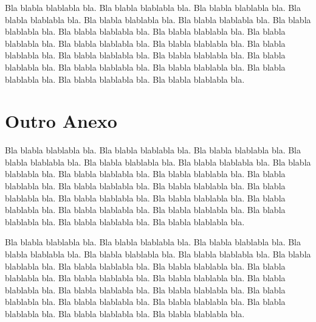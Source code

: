 \documentclass[tese,capa]{texufpel}
\begin{document}
Bla blabla blablabla bla.  Bla blabla blablabla bla.  Bla blabla
blablabla bla.  Bla blabla blablabla bla.  Bla blabla blablabla bla.
Bla blabla blablabla bla.  Bla blabla blablabla bla.  Bla blabla
blablabla bla.  Bla blabla blablabla bla.  Bla blabla blablabla bla.
Bla blabla blablabla bla.  Bla blabla blablabla bla.  Bla blabla
blablabla bla.  Bla blabla blablabla bla.  Bla blabla blablabla bla.
Bla blabla blablabla bla.  Bla blabla blablabla bla.  Bla blabla
blablabla bla.  Bla blabla blablabla bla.  Bla blabla blablabla bla.
Bla blabla blablabla bla.

\chapter{Outro Anexo}

Bla blabla blablabla bla.  Bla blabla blablabla bla.  Bla blabla
blablabla bla.  Bla blabla blablabla bla.  Bla blabla blablabla bla.
Bla blabla blablabla bla.  Bla blabla blablabla bla.  Bla blabla
blablabla bla.  Bla blabla blablabla bla.  Bla blabla blablabla bla.
Bla blabla blablabla bla.  Bla blabla blablabla bla.  Bla blabla
blablabla bla.  Bla blabla blablabla bla.  Bla blabla blablabla bla.
Bla blabla blablabla bla.  Bla blabla blablabla bla.  Bla blabla
blablabla bla.  Bla blabla blablabla bla.  Bla blabla blablabla bla.
Bla blabla blablabla bla.

Bla blabla blablabla bla.  Bla blabla blablabla bla.  Bla blabla
blablabla bla.  Bla blabla blablabla bla.  Bla blabla blablabla bla.
Bla blabla blablabla bla.  Bla blabla blablabla bla.  Bla blabla
blablabla bla.  Bla blabla blablabla bla.  Bla blabla blablabla bla.
Bla blabla blablabla bla.  Bla blabla blablabla bla.  Bla blabla
blablabla bla.  Bla blabla blablabla bla.  Bla blabla blablabla bla.
Bla blabla blablabla bla.  Bla blabla blablabla bla.  Bla blabla
blablabla bla.  Bla blabla blablabla bla.  Bla blabla blablabla bla.
Bla blabla blablabla bla.
\end{document}
